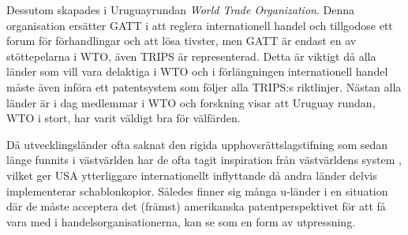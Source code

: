 Dessutom skapades i Uruguayrundan \emph{World Trade Organization}. Denna organisation ersätter GATT i att reglera internationell handel och tillgodose ett forum för förhandlingar och att lösa tivster, men GATT är endast en av stöttepelarna i WTO, även TRIPS är representerad. Detta är viktigt då alla länder som vill vara delaktiga i WTO och i förlängningen internationell handel måste även införa ett patentsystem som följer alla TRIPS:s riktlinjer. Nästan alla länder är i dag medlemmar i WTO och forskning visar att Uruguay rundan, WTO i stort, har varit väldigt bra för välfärden\cite{harrison}. 

Då utvecklingsländer ofta saknat den rigida upphovsrättslagstifning som sedan länge funnits i västvärlden har de ofta tagit inspiration från västvärldens system \cite{finger}, vilket ger USA ytterliggare internationellt inflyttande då andra länder delvis implementerar schablonkopior. Således finner sig många u-länder i en situation där de måste acceptera det (främst) amerikanska patentperspektivet för att få vara med i handelsorganisationerna, kan se som en form av utpressning.

